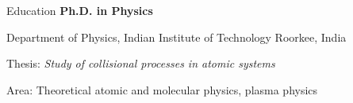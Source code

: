 \begin{rubric}{Education}
\entry*[2008 -- 2012]%
  \textbf{Ph.D. in Physics}\par
  Department of Physics, Indian Institute of Technology Roorkee, India\par
  Thesis: \emph{Study of collisional processes in atomic systems}\par
  Area: Theoretical atomic and molecular physics, plasma physics
\end{rubric}
